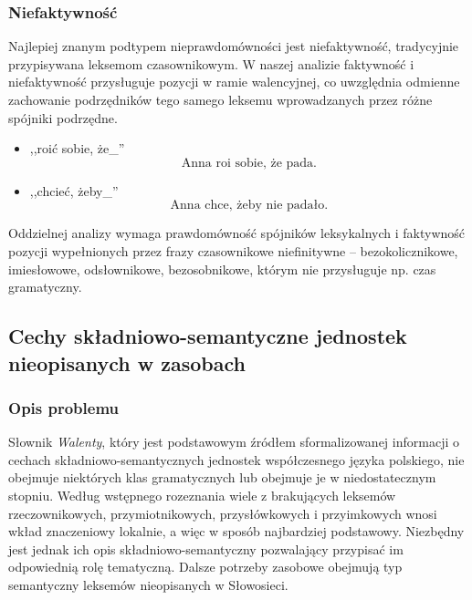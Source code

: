 \documentclass[a4paper, 12pt]{article}
\theoremstyle{remark}
\begin{document}
\subsubsection{Niefaktywność} %
Najlepiej znanym podtypem nieprawdomówności jest niefaktywność, tradycyjnie przypisywana leksemom czasownikowym. W naszej analizie faktywność i niefaktywność przysługuje pozycji w ramie walencyjnej, co uwzględnia odmienne zachowanie podrzędników tego samego leksemu wprowadzanych przez różne spójniki podrzędne.
\begin{itemize}
	\item ,,roić sobie, że\_''
	\begin{equation}
		\text{Anna roi sobie, że pada.} 
	\end{equation}
	\item ,,chcieć, żeby\_''
	\begin{equation}
		\text{Anna chce, żeby nie padało.} 
	\end{equation}
\end{itemize}

Oddzielnej analizy wymaga prawdomówność spójników leksykalnych i faktywność pozycji wypełnionych przez frazy czasownikowe niefinitywne -- bezokolicznikowe, imiesłowowe, odsłownikowe, bezosobnikowe, którym nie przysługuje np. czas gramatyczny.
	

\subsection{Cechy składniowo-semantyczne jednostek nieopisanych w zasobach} %
{
\renewcommand\thesubsection{}
\renewcommand\thesubsubsection{}
\setcounter{subsection}{-1}
\subsubsection{Opis problemu} %
\label{sub:opis_problemu}
}
Słownik \emph{Walenty}, który jest podstawowym źródłem sformalizowanej informacji o cechach składniowo-semantycznych jednostek współczesnego języka polskiego, nie obejmuje niektórych klas gramatycznych lub obejmuje je w niedostatecznym stopniu.
Według wstępnego rozeznania wiele z brakujących leksemów rzeczownikowych, przymiotnikowych, przysłówkowych i przyimkowych wnosi wkład znaczeniowy lokalnie, a więc w sposób najbardziej podstawowy. Niezbędny jest jednak ich opis składniowo-semantyczny pozwalający przypisać im odpowiednią rolę tematyczną.
Dalsze potrzeby zasobowe obejmują typ semantyczny leksemów nieopisanych w Słowosieci.
\end{document}
